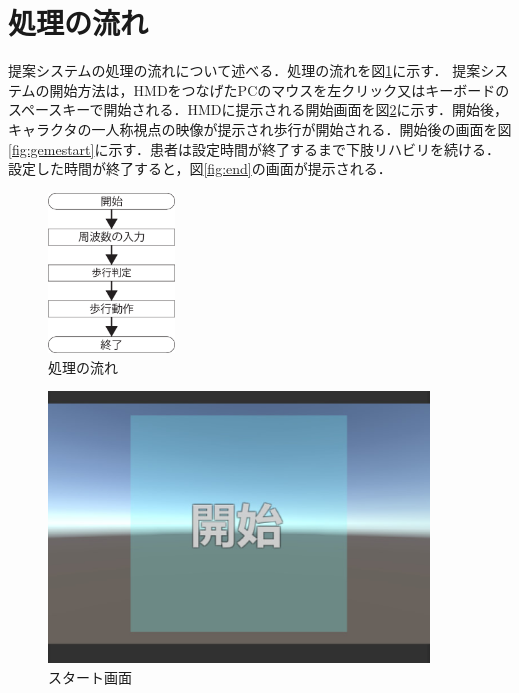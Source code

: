 \section{処理の流れ}
提案システムの処理の流れについて述べる．処理の流れを図\ref{fig:片桐2}に示す．
提案システムの開始方法は，HMDをつなげたPCのマウスを左クリック又はキーボードのスペースキーで開始される．HMDに提示される開始画面を図\ref{fig:start}に示す．開始後，キャラクタの一人称視点の映像が提示され歩行が開始される．開始後の画面を図\ref{fig:gemestart}に示す．患者は設定時間が終了するまで下肢リハビリを続ける．設定した時間が終了すると，図\ref{fig:end}の画面が提示される．
\begin{figure}[tbp]
	\centering
			\includegraphics[width=0.3\textwidth]{chap2-figure/katagiri2.eps}
	\caption{処理の流れ}
	\label{fig:片桐2}
\end{figure}

\begin{figure}[tbp]
	\centering
			\includegraphics[width=0.9\textwidth]{chap2-figure/start.eps}
	\caption{スタート画面}
	\label{fig:start}
\end{figure}


